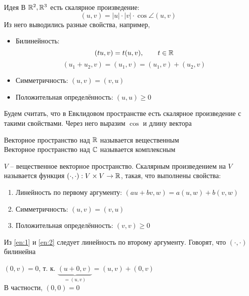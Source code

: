 \begin{undefthm}{Идея}
	В $ \mathbb{R}^2, \mathbb{R}^3 $ есть скалярное произведение:
    $$ (u, v) = |u| \cdot |v| \cdot \cos \angle(u, v) $$
    Из него выводились разные свойства, например,
    \begin{itemize}
    	\item Билинейность:
        $$ (tu, v) = t(u, v), \qquad t \in \mathbb{R} $$
        $$ (u_1 + u_2, v) = (u_1, v) = (u_1, v) + (u_2, v) $$
        \item Симметричность: $ (u, v) = (v, u) $
        \item Положительная определённость: $ (u, u) \ge 0 $
    \end{itemize}
    Будем считать, что в Евклидовом пространстве есть скалярное произведение с такими свойствами. Через него выразим $ \cos $ и длину вектора
\end{undefthm}

\begin{definition}
	Векторное пространство над $ \mathbb{R} $ называется вещественным \\
    Векторное пространство над $ \mathbb{C} $ называется комплексным
\end{definition}

\begin{definition}
	$ V $ -- вещественное векторное пространство. Скалярным произведением на $ V $ называется функция $ (\cdot, \cdot) : V \times V \to \mathbb{R} $, такая, что выполнены свойства:
    \begin{enumerate}
        \item \label{en:1} Линейность по первому аргументу: $ (au + bv, w) = a(u, w) + b(v, w) $
        \item \label{en:2} Симметричность: $ (u, v) = (v, u) $
        \item Положительная определённость: $ (v, v) \ge 0 $
    \end{enumerate}
\end{definition}

\begin{remark}
    Из \ref{en:1} и \ref{en:2} следует линейность по второму аргументу. Говорят, что $ (\cdot, \cdot) $ билинейна
\end{remark}

\begin{remark}
    $ (0, v) = 0 $, т. к. $ \underbrace{(u + 0, v)}_{= (u, v)} = (u, v) + (0, v) $ \\
    В частности, $ (0, 0) = 0 $
\end{remark}

